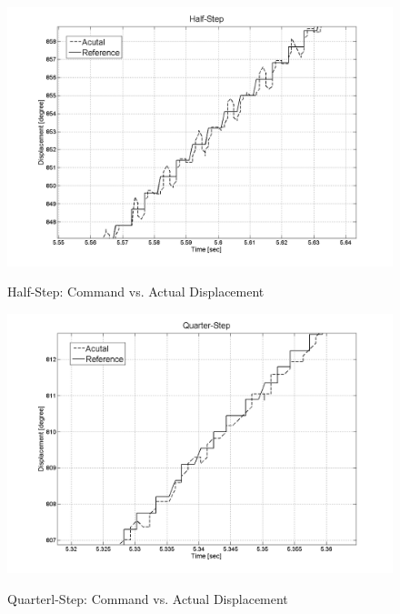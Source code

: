 \documentclass{article}
\theoremstyle{plain}
\theoremstyle{definition}
\theoremstyle{remark}
\begin{document}
\begin{figure}[htb]
\begin{center}
\includegraphics[width=14cm]{Q4_half_step_L.png}
\caption{Half-Step: Command vs. Actual Displacement} \label{tex}
\label{fig:q4_16}
\end{center}
\end{figure}


\begin{figure}[htb]
\begin{center}
\includegraphics[width=14cm]{Q4_quarter_step_L.png}
\caption{Quarterl-Step: Command vs. Actual Displacement} \label{tex}
\label{fig:q4_17}
\end{center}
\end{figure}
\end{document}
